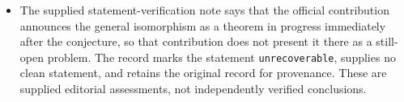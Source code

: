 \documentclass[11pt]{article}
\begin{document}
\begin{itemize}
\item The supplied statement-verification note says that the official contribution announces the general isomorphism as a theorem in progress immediately after the conjecture, so that contribution does not present it there as a still-open problem. The record marks the statement \texttt{unrecoverable}, supplies no clean statement, and retains the original record for provenance. These are supplied editorial assessments, not independently verified conclusions.
\end{itemize}
\end{document}
